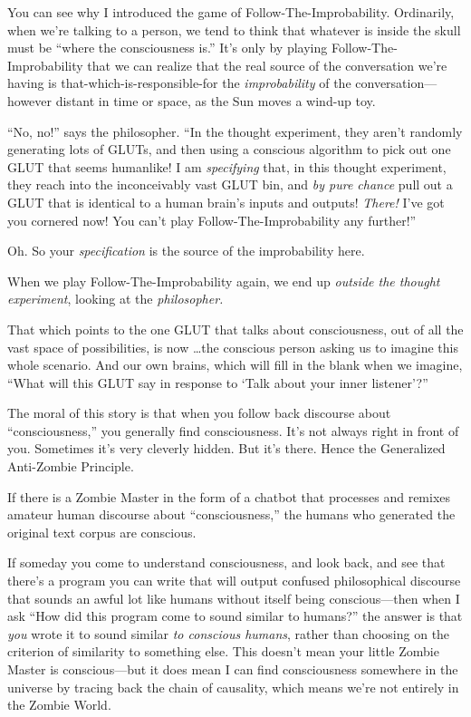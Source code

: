 {
 You can see why I introduced the game of Follow-The-Improbability.
Ordinarily, when we're talking to a person, we tend to
think that whatever is inside the skull must be
``where the consciousness is.''
It's only by playing Follow-The-Improbability that we
can realize that the real source of the conversation
we're having is that-which-is-responsible-for the
\textit{improbability} of the conversation---however distant in time or
space, as the Sun moves a wind-up toy.}

{
 ``No, no!'' says the
philosopher. ``In the thought experiment, they
aren't randomly generating lots of GLUTs, and then
using a conscious algorithm to pick out one GLUT that seems humanlike!
I am \textit{specifying} that, in this thought experiment, they reach
into the inconceivably vast GLUT bin, and \textit{by pure chance} pull
out a GLUT that is identical to a human brain's inputs
and outputs! \textit{There!} I've got you cornered now!
You can't play Follow-The-Improbability any
further!''}

{
 Oh. So your \textit{specification} is the source of the
improbability here.}

{
 When we play Follow-The-Improbability again, we end up
\textit{outside the thought experiment}, looking at the
\textit{philosopher.}}

{
 That which points to the one GLUT that talks about consciousness,
out of all the vast space of possibilities, is now \ldots the conscious
person asking us to imagine this whole scenario. And our own brains,
which will fill in the blank when we imagine, ``What
will this GLUT say in response to `Talk about your inner
listener'?''}

{
 The moral of this story is that when you follow back discourse
about ``consciousness,'' you
generally find consciousness. It's not always right in
front of you. Sometimes it's very cleverly hidden. But
it's there. Hence the Generalized Anti-Zombie
Principle.}

{
 If there is a Zombie Master in the form of a chatbot that
processes and remixes amateur human discourse about
``consciousness,'' the humans who
generated the original text corpus are conscious.}

{
 If someday you come to understand consciousness, and look back,
and see that there's a program you can write that will
output confused philosophical discourse that sounds an awful lot like
humans without itself being conscious---then when I ask
``How did this program come to sound similar to
humans?'' the answer is that \textit{you} wrote it to
sound similar \textit{to conscious humans}, rather than choosing on the
criterion of similarity to something else. This doesn't
mean your little Zombie Master is conscious---but it does mean I can
find consciousness somewhere in the universe by tracing back the chain
of causality, which means we're not entirely in the
Zombie World.}

